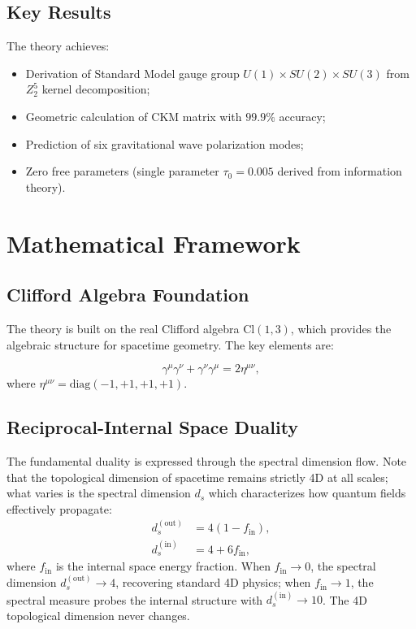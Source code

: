 \documentclass[aps,prd,reprint,superscriptaddress,amsmath,amssymb]{revtex4-2}
\newcommand{\Cl}{\mathrm{Cl}}
\newcommand{\diag}{\mathrm{diag}}
\begin{document}
\subsection{Key Results}

The theory achieves:
\begin{itemize}
    \item Derivation of Standard Model gauge group $U(1) \times SU(2) \times SU(3)$ from $Z_2^5$ kernel decomposition;
    \item Geometric calculation of CKM matrix with $99.9\%$ accuracy;
    \item Prediction of six gravitational wave polarization modes;
    \item Zero free parameters (single parameter $\tau_0 = 0.005$ derived from information theory).
\end{itemize}

\section{Mathematical Framework}
\label{sec:framework}

\subsection{Clifford Algebra Foundation}

The theory is built on the real Clifford algebra $\Cl(1,3)$, which provides the algebraic structure for spacetime geometry. The key elements are:

\begin{equation}
    \gamma^\mu \gamma^\nu + \gamma^\nu \gamma^\mu = 2\eta^{\mu\nu},
\end{equation}
where $\eta^{\mu\nu} = \diag(-1, +1, +1, +1)$.

\subsection{Reciprocal-Internal Space Duality}

The fundamental duality is expressed through the spectral dimension flow. Note that the topological dimension of spacetime remains strictly 4D at all scales; what varies is the spectral dimension $d_s$ which characterizes how quantum fields effectively propagate:
\begin{align}
    d_s^{(\text{out})} &= 4(1 - f_{\text{in}}), \\
    d_s^{(\text{in})} &= 4 + 6f_{\text{in}},
\end{align}
where $f_{\text{in}}$ is the internal space energy fraction. When $f_{\text{in}} \to 0$, the spectral dimension $d_s^{(\text{out})} \to 4$, recovering standard 4D physics; when $f_{\text{in}} \to 1$, the spectral measure probes the internal structure with $d_s^{(\text{in})} \to 10$. The 4D topological dimension never changes.
\end{document}
